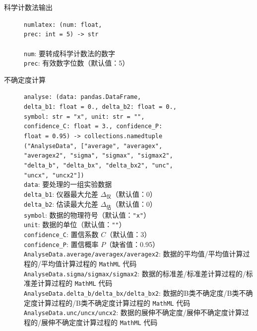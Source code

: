 \begin{description}
  \item[科学计数法输出] \verb|numlatex: (num: float,|\\\verb|prec: int = 5) -> str|\\
  \\
  \verb|num|: 要转成科学计数法的数字\\
  \verb|prec|: 有效数字位数（默认值：5）
  \item[不确定度计算] \verb|analyse: (data: pandas.DataFrame,|\\\verb|delta_b1: float = 0., delta_b2: float = 0.,|\\\verb|symbol: str = "x", unit: str = "",|\\\verb|confidence_C: float = 3., confidence_P:|\\\verb|float = 0.95) -> collections.namedtuple|\\\verb|("AnalyseData", ["average", "averagex",|\\\verb|"averagex2", "sigma", "sigmax", "sigmax2",|\\\verb|"delta_b", "delta_bx", "delta_bx2", "unc",|\\\verb|"uncx", "uncx2"])|\\
  \verb|data|: 要处理的一组实验数据\\
  \verb|delta_b1|: 仪器最大允差 \(\Delta_\text{仪}\)（默认值：0）\\
  \verb|delta_b2|: 估读最大允差 \(\Delta_\text{估}\)（默认值：0）\\
  \verb|symbol|: 数据的物理符号（默认值：\verb|"x"|）\\
  \verb|unit|: 数据的单位（默认值：\verb|""|）\\
  \verb|confidence_C|: 置信系数 \(C\)（默认值：3）\\
  \verb|confidence_P|: 置信概率 \(P\)（缺省值：0.95）\\
  \verb|AnalyseData.average/averagex/averagex2|: 数据的平均值/平均值计算过程的/平均值计算过程的 \verb|MathML| 代码\\
  \verb|AnalyseData.sigma/sigmax/sigmax2|: 数据的标准差/标准差计算过程的/标准差计算过程的 \verb|MathML| 代码\\
  \verb|AnalyseData.delta_b/delta_bx/delta_bx2|: 数据的B类不确定度/B类不确定度计算过程的/B类不确定度计算过程的 \verb|MathML| 代码\\
  \verb|AnalyseData.unc/uncx/uncx2|: 数据的展伸不确定度/展伸不确定度计算过程的/展伸不确定度计算过程的 \verb|MathML| 代码

\end{description}

